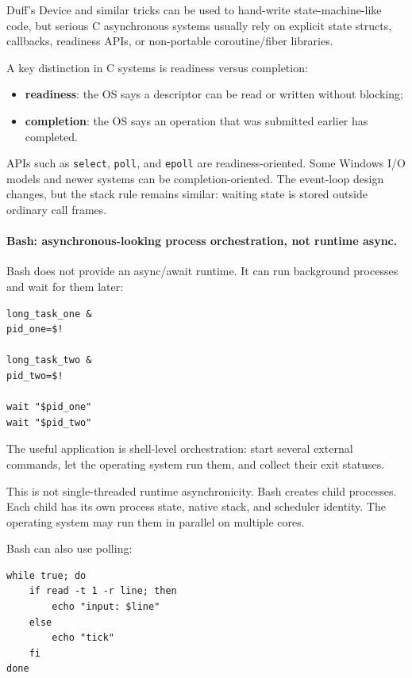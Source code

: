Duff's Device and similar tricks can be used to hand-write state-machine-like code, but serious C asynchronous systems usually rely on explicit state structs, callbacks, readiness APIs, or non-portable coroutine/fiber libraries.

A key distinction in C systems is readiness versus completion:

\begin{itemize}
    \item \textbf{readiness}: the OS says a descriptor can be read or written without blocking;
    \item \textbf{completion}: the OS says an operation that was submitted earlier has completed.
\end{itemize}

APIs such as \texttt{select}, \texttt{poll}, and \texttt{epoll} are readiness-oriented. Some Windows I/O models and newer systems can be completion-oriented. The event-loop design changes, but the stack rule remains similar: waiting state is stored outside ordinary call frames.

\paragraph{Bash: asynchronous-looking process orchestration, not runtime async.}

Bash does not provide an async/await runtime. It can run background processes and wait for them later:

\begin{verbatim}
long_task_one &
pid_one=$!

long_task_two &
pid_two=$!

wait "$pid_one"
wait "$pid_two"
\end{verbatim}

The useful application is shell-level orchestration: start several external commands, let the operating system run them, and collect their exit statuses.

This is not single-threaded runtime asynchronicity. Bash creates child processes. Each child has its own process state, native stack, and scheduler identity. The operating system may run them in parallel on multiple cores.

Bash can also use polling:

\begin{verbatim}
while true; do
    if read -t 1 -r line; then
        echo "input: $line"
    else
        echo "tick"
    fi
done
\end{verbatim}

